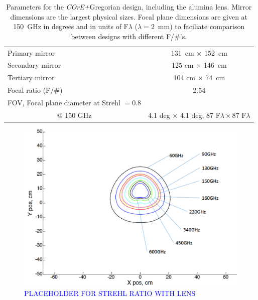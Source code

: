 \documentclass[11pt,a4paper]{article}
\newcommand{\comblue}[1]{\textcolor{blue}{#1}}
\newcommand{\coreplus}{\textit{\negthinspace COrE+\/}}
\begin{document}
\begin{table}[h!]
	\centering
	\begin{tabular}{|l|c|}
		\hline
		Primary mirror   & 131~cm $\times$ 152~cm   \\
		Secondary mirror   & 125 cm $\times$ 146~cm  \\
		Tertiary mirror  & 104 cm $\times$ 74~cm    \\
		Focal ratio (F/\#)               & 2.54   \\
		\multicolumn{1}{|l|}{FOV, Focal plane diameter at Strehl $= 0.8$} & \\
		\multicolumn{1}{|c|}{@ 150 GHz}    & 4.1 deg $\times$ 4.1 deg, 87 F$\lambda \times 87 \text{~F}\lambda$ \\
		\hline
		
	\end{tabular}
	\caption{Parameters for the \coreplus Gregorian design, including the alumina lens.  Mirror dimensions are the largest physical sizes.  Focal 
		plane dimensions are given at 150~GHz in degrees and in units of F$\lambda$ ($\lambda=2$~mm) to faciliate comparison between 
		designs with different F/\#'s. }
	\label{tab:mirrors_greg}
	
\end{table}
\begin{figure}[htbp]
	\centering
	\includegraphics[scale=0.5]{core_nolens_strehl.png}
	\caption{\comblue{PLACEHOLDER FOR STREHL RATIO WITH LENS}}
	\label{fig:greg_lens_strehl}
\end{figure}
\end{document}
